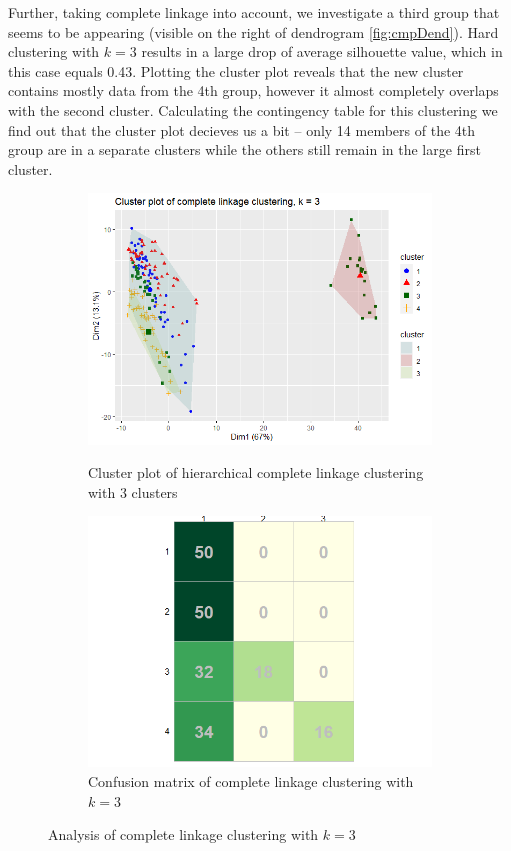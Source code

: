 \documentclass[12pt]{article}
\begin{document}
Further, taking complete linkage into account, we investigate a third group that seems to be appearing (visible on the right of dendrogram \ref{fig:cmpDend}). Hard clustering with
$k = 3$ results in a large drop of average silhouette value, which in this case equals 0.43. Plotting the cluster plot reveals that the new cluster contains
mostly data from the 4th group, however it almost completely overlaps with the second cluster. Calculating the contingency table for this clustering we find out
that the cluster plot decieves us a bit -- only 14 members of the 4th group are in a separate clusters while the others still remain in the large first cluster.
\begin{figure}[h]
  \begin{subfigure}[b]{0.5\linewidth}
      \centering
      \includegraphics[width=\textwidth]{../images/project2/clusPlot_cmt3.png}
      \label{fig:clusPlot_cmt3}
      \caption{Cluster plot of hierarchical complete linkage clustering with 3 clusters}
  \end{subfigure}%
  \begin{subfigure}[b]{0.5\linewidth}
      \centering
   \includegraphics[width=\textwidth]{../images/project2/confMat_comp3.png}
   \caption{Confusion matrix of complete linkage clustering with $k=3$}\label{fig:confMat_comp3}
  \end{subfigure}%
 \caption{Analysis of complete linkage clustering with $k=3$}
\end{figure}
\end{document}
